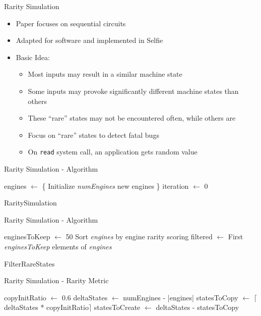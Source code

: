 \documentclass[10pt]{beamer}
\begin{document}
\begin{frame}{Rarity Simulation}
	\begin{itemize}
		\item Paper focuses on sequential circuits
		\item Adapted for software and implemented in Selfie
		\item Basic Idea:
		\begin{itemize}
			\item Most inputs may result in a similar machine state
			\item Some inputs may provoke significantly different machine states than others
			\item These \enquote{rare} states may not be encountered often, while others are
			\item Focus on \enquote{rare} states to detect fatal bugs
			\item On \texttt{read} system call, an application gets random value
		\end{itemize}
	\end{itemize}
\end{frame}

\begin{frame}{Rarity Simulation - Algorithm}
	\begin{algorithm}[H]
		\SetAlgoLined
		engines $\gets$ \{ Initialize \textit{numEngines} new engines \}\;
		iteration $\gets$ 0\;
		\caption{RaritySimulation}
	\end{algorithm}
\end{frame}

\begin{frame}{Rarity Simulation - Algorithm}
		\begin{algorithm}[H]
		\SetAlgoLined
		enginesToKeep $\gets$ 50\;
		Sort \textit{engines} by engine rarity scoring\;
		filtered $\gets$ First \textit{enginesToKeep} elements of \textit{engines}\;
		\caption{FilterRareStates}
	\end{algorithm}
\end{frame}

\begin{frame}{Rarity Simulation - Rarity Metric}
	\begin{algorithm}[H]
		\SetAlgoLined
		copyInitRatio $\gets$ 0.6\;
		deltaStates $\gets$ numEngines - |engines|\;
		statesToCopy $\gets$ $\lceil$deltaStates * copyInitRatio$\rceil$\;
		statesToCreate $\gets$ deltaStates - statesToCopy\;

	\end{algorithm}
\end{frame}

\begin{frame}[allowframebreaks]
    \printbibliography
\end{frame}
\end{document}
